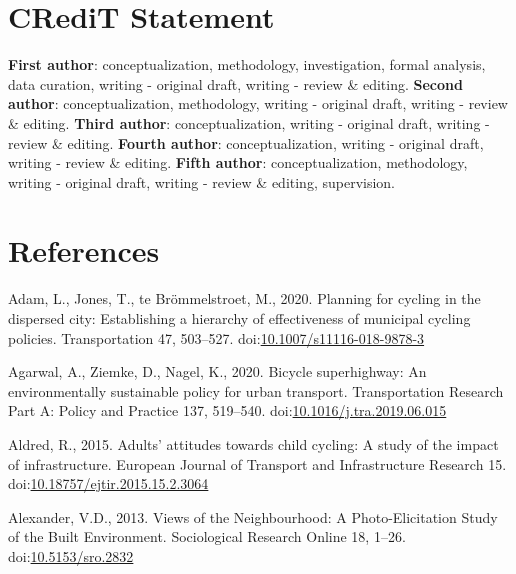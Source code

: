 \documentclass[]{elsarticle} %
\begin{document}
\hypertarget{sec:credit}{%
\section{CRediT Statement}\label{sec:credit}}

\textbf{First author}: conceptualization, methodology, investigation,
formal analysis, data curation, writing - original draft, writing -
review \& editing. \textbf{Second author}: conceptualization,
methodology, writing - original draft, writing - review \& editing.
\textbf{Third author}: conceptualization, writing - original draft,
writing - review \& editing. \textbf{Fourth author}: conceptualization,
writing - original draft, writing - review \& editing. \textbf{Fifth
author}: conceptualization, methodology, writing - original draft,
writing - review \& editing, supervision.

\hypertarget{sec:references}{%
\section*{References}\label{sec:references}}

\hypertarget{refs}{}
\leavevmode\hypertarget{ref-adamPlanningCyclingDispersed2020}{}%
Adam, L., Jones, T., te Brömmelstroet, M., 2020. Planning for cycling in
the dispersed city: Establishing a hierarchy of effectiveness of
municipal cycling policies. Transportation 47, 503--527.
doi:\href{https://doi.org/10.1007/s11116-018-9878-3}{10.1007/s11116-018-9878-3}

\leavevmode\hypertarget{ref-agarwalBicycleSuperhighwayEnvironmentally2020}{}%
Agarwal, A., Ziemke, D., Nagel, K., 2020. Bicycle superhighway: An
environmentally sustainable policy for urban transport. Transportation
Research Part A: Policy and Practice 137, 519--540.
doi:\href{https://doi.org/10.1016/j.tra.2019.06.015}{10.1016/j.tra.2019.06.015}

\leavevmode\hypertarget{ref-aldredAdultsAttitudesChild2015}{}%
Aldred, R., 2015. Adults' attitudes towards child cycling: A study of
the impact of infrastructure. European Journal of Transport and
Infrastructure Research 15.
doi:\href{https://doi.org/10.18757/ejtir.2015.15.2.3064}{10.18757/ejtir.2015.15.2.3064}

\leavevmode\hypertarget{ref-alexanderViewsNeighbourhoodPhotoElicitation2013}{}%
Alexander, V.D., 2013. Views of the Neighbourhood: A Photo-Elicitation
Study of the Built Environment. Sociological Research Online 18, 1--26.
doi:\href{https://doi.org/10.5153/sro.2832}{10.5153/sro.2832}
\end{document}
